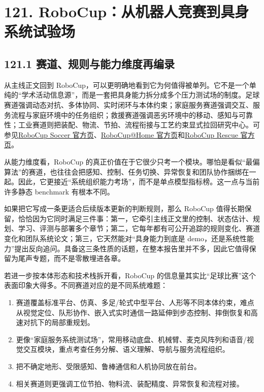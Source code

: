 \section*{121. RoboCup：从机器人竞赛到具身系统试验场}

\subsection*{121.1 赛道、规则与能力维度再编录}


从主线正文回到 RoboCup，可以更明确地看到它为何值得被单列。它不是一个单纯的“学术活动信息源”，而是一套把具身能力拆分成多个压力测试场的制度。足球赛道强调动态对抗、多体协同、实时闭环与本体约束；家庭服务赛道强调交互、服务流程与家庭环境中的任务组织；救援赛道强调恶劣环境中的移动、感知与可靠性；工业赛道则把装配、物流、节拍、流程衔接与工艺约束显式拉回研究中心。可参见\href{https://www.robocup.org/domains/1}{RoboCup Soccer 官方页}、\href{https://athome.robocup.org/}{RoboCup@Home 官方页}和\href{https://www.robocup.org/domains/2}{RoboCup Rescue 官方页}。

从能力维度看，RoboCup 的真正价值在于它很少只考一个模块。哪怕是看似“最偏算法”的赛道，也往往会把感知、控制、任务切换、异常恢复和团队协作捆绑在一起。因此，它更接近“系统组织能力考场”，而不是单点模型指标榜。这一点与当前许多静态 benchmark 有根本不同。

如果把它写成一条更适合后续版本更新的判断规则，那么 RoboCup 值得长期保留，恰恰因为它同时满足三件事：第一，它牵引主线正文里的控制、状态估计、规划、学习、评测与部署多个章节；第二，它每年都有可公开追踪的规则变化、赛道变化和团队系统论文；第三，它天然能对“具身能力到底是 demo，还是系统性能力”提出反向追问。具备这三条性质的话题，在整本报告里并不多，因此它值得保留为尾声专题，而不是零散埋进各章。

若进一步按本体形态和技术栈拆开看，RoboCup 的信息量其实比“足球比赛”这个表面印象大得多。不同赛道对应的是不同系统难题：

\begin{enumerate}
\item \texttt{} 赛道覆盖标准平台、仿真、多足/轮式中型平台、人形等不同本体约束，难点从视觉定位、队形协作、嵌入式实时通信一路延伸到步态控制、摔倒恢复和高速对抗下的局部重规划。
\item \texttt{} 更像“家庭服务系统测试场”，常用移动底盘、机械臂、麦克风阵列和语音/视觉交互模块，重点考查任务分解、语义理解、导航与服务流程组织。
\item \texttt{} 把不确定地形、受限感知、鲁棒通信和人机协同放在前台。
\item \texttt{} 相关赛道则更强调工位节拍、物料流、装配精度、异常恢复和流程对接。
\end{enumerate}

